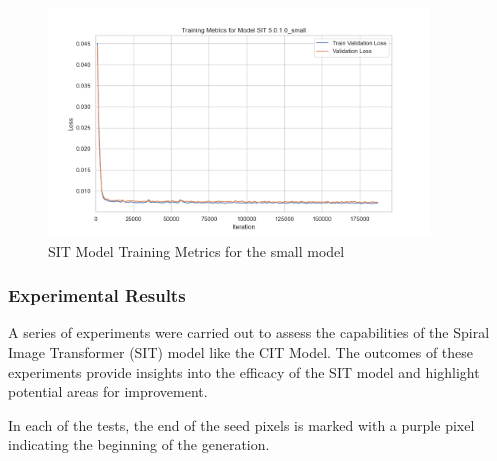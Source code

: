 \begin{figure}[H]
    \centering
    \includegraphics[width=0.9\textwidth]{imgs/Training_Metrics_SIT 5.0.1.0_small.png}
    \caption{SIT Model Training Metrics for the small model}
    \label{fig:Training_Metrics_SITSmall}
\end{figure}

\subsubsection{Experimental Results}

A series of experiments were carried out to assess the capabilities of the Spiral Image Transformer (SIT) model like the CIT Model. The outcomes of these experiments provide insights into the efficacy of the SIT model and highlight potential areas for improvement.

In each of the tests, the end of the seed pixels is marked with a purple pixel indicating the beginning of the generation.

